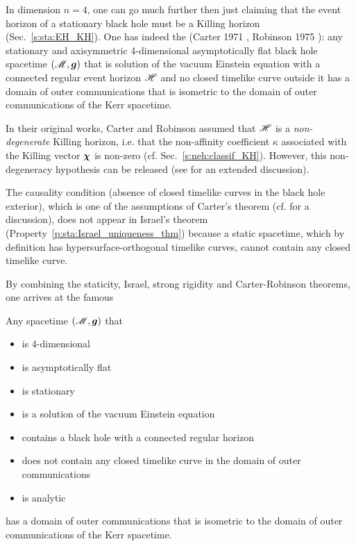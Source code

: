 In dimension $n=4$, one can go much further then just claiming that the
event horizon of a stationary black hole must be a Killing horizon (Sec.~\ref{s:sta:EH_KH}).
One has indeed the 
(Carter 1971 \cite{Carte71}, Robinson 1975 \cite{Robin75}):
any stationary and axisymmetric 4-dimensional asymptotically flat
black hole spacetime $(\mathscr{M},\bm{g})$ that is
solution of the vacuum Einstein equation with a connected regular
event horizon $\mathscr{H}$ and no closed timelike curve outside it
has a domain of outer communications that is isometric
to the domain of outer communications of the Kerr spacetime.

\begin{remark}
In their original works, Carter and Robinson assumed that $\mathscr{H}$ is a
\emph{non-degenerate}
Killing horizon, i.e. that the non-affinity coefficient $\kappa$ associated
with the Killing vector $\bm{\chi}$ is non-zero (cf. Sec.~\ref{s:neh:classif_KH}). However, this non-degeneracy
hypothesis can be released \cite{ChrusN10} (see \cite{ChrusLH12} for an
extended discussion).
\end{remark}

\begin{remark}
The causality condition (absence of closed timelike curves in the black
hole exterior), which is one of the assumptions of Carter's theorem
(cf. \cite{Carte99} for a discussion), does not appear in Israel's theorem
(Property~\ref{p:sta:Israel_uniqueness_thm}) because a static spacetime, which by definition
has hypersurface-orthogonal timelike curves,
cannot contain any closed timelike curve.
\end{remark}

By combining the staticity, Israel, strong rigidity and Carter-Robinson theorems,
one arrives at the famous
\begin{prop}
Any spacetime $(\mathscr{M},\bm{g})$ that
\begin{itemize}
\item is 4-dimensional
\item is asymptotically flat
\item is stationary
\item is a solution of the vacuum Einstein equation
\item contains a black hole with a connected regular horizon
\item does not contain any closed timelike curve in the domain of outer
communications
\item is analytic
\end{itemize}
has a domain of outer communications that is isometric
to the domain of outer communications of the Kerr spacetime.
\end{prop}

